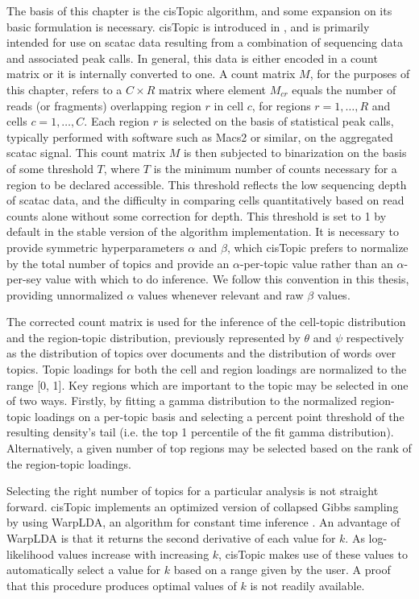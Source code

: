 The basis of this chapter is the cisTopic algorithm, and some expansion on its basic formulation is necessary. cisTopic is introduced in \textcite{BravoGonzalez-Blas2019}, and is primarily intended for use on \gls{scatac} data resulting from a combination of sequencing data and associated peak calls. In general, this data is either encoded in a count matrix or it is internally converted to one. A count matrix $M$, for the purposes of this chapter, refers to a $C \times R$ matrix where element $M_{cr}$ equals the number of reads (or fragments) overlapping region $r$ in cell $c$, for regions $r=1,\ldots,R$ and cells $c=1,\ldots,C$. Each region $r$ is selected on the basis of statistical peak calls, typically performed with software such as Macs2 or similar, on the aggregated \gls{scatac} signal. This count matrix $M$ is then subjected to binarization on the basis of some threshold $T$, where $T$ is the minimum number of counts necessary for a region to be declared accessible. This threshold reflects the low sequencing depth of \gls{scatac} data, and the difficulty in comparing cells quantitatively based on read counts alone without some correction for depth. This threshold is set to 1 by default in the stable version of the algorithm implementation. It is necessary to provide symmetric hyperparameters $\alpha$ and $\beta$, which cisTopic prefers to normalize by the total number of topics and provide an $\alpha$-per-topic value rather than an $\alpha$-per-sey value with which to do inference. We follow this convention in this thesis, providing unnormalized $\alpha$ values whenever relevant and raw $\beta$ values.   

The corrected count matrix is used for the inference of the cell-topic distribution and the region-topic distribution, previously represented by $\theta$ and $\psi$ respectively as the distribution of topics over documents and the distribution of words over topics. Topic loadings for both the cell and region loadings are normalized to the range [0, 1]. Key regions which are important to the topic may be selected in one of two ways. Firstly, by fitting a gamma distribution to the normalized region-topic loadings on a per-topic basis and selecting a percent point threshold of the resulting density's tail (i.e. the top 1 percentile of the fit gamma distribution). Alternatively, a given number of top regions may be selected based on the rank of the region-topic loadings.  

Selecting the right number of topics for a particular analysis is not straight forward. cisTopic implements an optimized version of collapsed Gibbs sampling by using WarpLDA, an algorithm for constant time inference \cite{Chen2016a}. An advantage of WarpLDA is that it returns the second derivative of each value for $k$. As log-likelihood values increase with increasing $k$, cisTopic makes use of these values to automatically select a value for $k$ based on a range given by the user. A proof that this procedure produces optimal values of $k$ is not readily available. 

